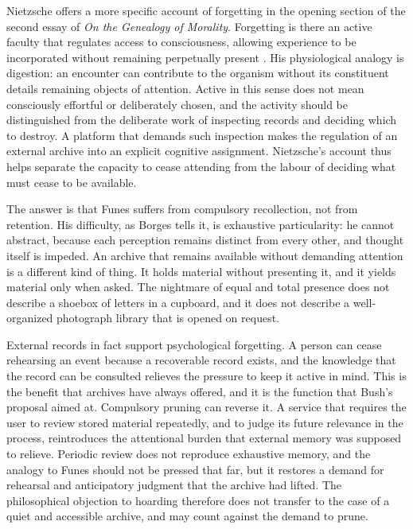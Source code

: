 \documentclass[12pt]{article}
\begin{document}
Nietzsche offers a more specific account of forgetting in the opening section of the second essay of \emph{On the Genealogy of Morality}. Forgetting is there an active faculty that regulates access to consciousness, allowing experience to be incorporated without remaining perpetually present \cite[II, \S1]{nietzsche1887}. His physiological analogy is digestion: an encounter can contribute to the organism without its constituent details remaining objects of attention. Active in this sense does not mean consciously effortful or deliberately chosen, and the activity should be distinguished from the deliberate work of inspecting records and deciding which to destroy. A platform that demands such inspection makes the regulation of an external archive into an explicit cognitive assignment. Nietzsche's account thus helps separate the capacity to cease attending from the labour of deciding what must cease to be available.

The answer is that Funes suffers from compulsory recollection, not from retention. His difficulty, as Borges tells it, is exhaustive particularity: he cannot abstract, because each perception remains distinct from every other, and thought itself is impeded. An archive that remains available without demanding attention is a different kind of thing. It holds material without presenting it, and it yields material only when asked. The nightmare of equal and total presence does not describe a shoebox of letters in a cupboard, and it does not describe a well-organized photograph library that is opened on request.

External records in fact support psychological forgetting. A person can cease rehearsing an event because a recoverable record exists, and the knowledge that the record can be consulted relieves the pressure to keep it active in mind. This is the benefit that archives have always offered, and it is the function that Bush's proposal aimed at. Compulsory pruning can reverse it. A service that requires the user to review stored material repeatedly, and to judge its future relevance in the process, reintroduces the attentional burden that external memory was supposed to relieve. Periodic review does not reproduce exhaustive memory, and the analogy to Funes should not be pressed that far, but it restores a demand for rehearsal and anticipatory judgment that the archive had lifted. The philosophical objection to hoarding therefore does not transfer to the case of a quiet and accessible archive, and may count against the demand to prune.
\end{document}
